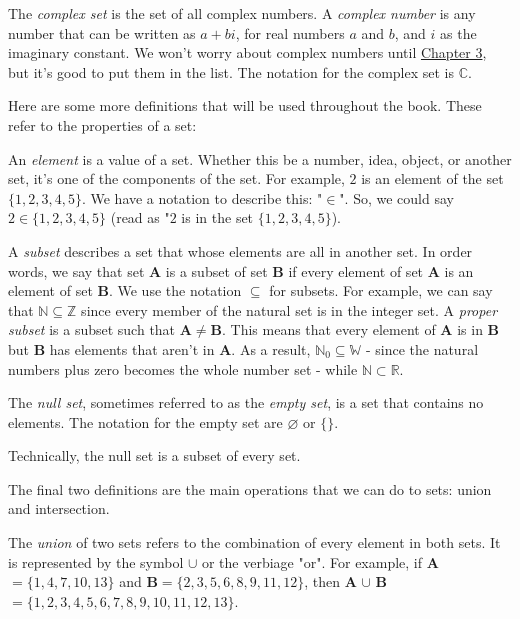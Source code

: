 \documentclass[lang=en,11pt]{elegantbook}
\begin{document}
The \textit{complex set} is the set of all complex numbers.  A \textit{complex number} is any number that can be written as $a+bi$, for real numbers $a$ and $b$, and $i$ as the imaginary constant.  We won't worry about complex numbers until \hyperlink{chapter.3}{Chapter 3}, but it's good to put them in the list.  The notation for the complex set is $\mathbb{C}$.

Here are some more definitions that will be used throughout the book.  These refer to the properties of a set:

An \textit{element} is a value of a set.  Whether this be a number, idea, object, or another set, it's one of the components of the set.  For example, $2$ is an element of the set $\{1,2,3,4,5\}$.  We have a notation to describe this: "$\in$".  So, we could say $2\in\{1,2,3,4,5\}$ (read as "$2$ is in the set $\{1,2,3,4,5\}$).

A \textit{subset} describes a set that whose elements are all in another set.  In order words, we say that set \textbf{A} is a subset of set \textbf{B} if every element of set \textbf{A} is an element of set \textbf{B}.  We use the notation $\subseteq$ for subsets.  For example, we can say that $\mathbb{N}\subseteq\mathbb{Z}$ since every member of the natural set is in the integer set.  A \textit{proper subset} is a subset such that \textbf{A}$\neq$\textbf{B}.  This means that every element of \textbf{A} is in \textbf{B} but \textbf{B} has elements that aren't in \textbf{A}.  As a result, $\mathbb{N}_0\subseteq\mathbb{W}$ - since the natural numbers plus zero becomes the whole number set - while $\mathbb{N}\subset\mathbb{R}$.

The \textit{null set}, sometimes referred to as the \textit{empty set}, is a set that contains no elements.  The notation for the empty set are $\varnothing$ or $\{\}$.

\begin{remark}
  Technically, the null set is a subset of every set.
\end{remark}

The final two definitions are the main operations that we can do to sets: union and intersection.  

The \textit{union} of two sets refers to the combination of every element in both sets.  It is represented by the symbol $\cup$ or the verbiage "or".  For example, if \textbf{A}$=\{1,4,7,10,13\}$ and \textbf{B}$=\{2,3,5,6,8,9,11,12\}$, then \textbf{A} $\cup$ \textbf{B} $=\{1,2,3,4,5,6,7,8,9,10,11,12,13\}$.
\end{document}
